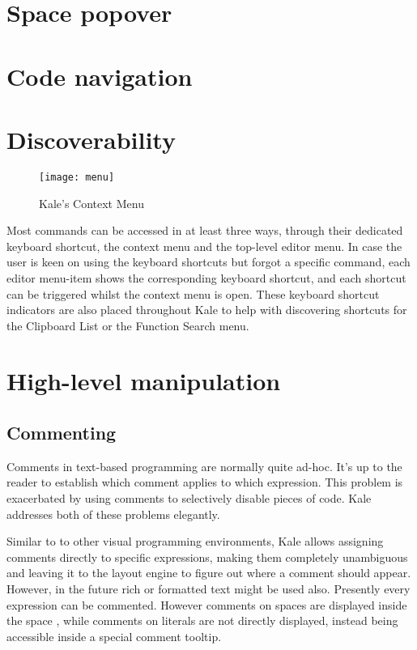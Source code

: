 \section{Space popover}




\section{Code navigation}


\needspace{8cm}
\section{Discoverability}
\begin{wrapfigure}[21]{r}{5.5cm}
\texttt{[image: menu]}
\caption{Kale's Context Menu}
\end{wrapfigure}
Most commands can be accessed in at least three ways, through their dedicated
keyboard shortcut, the context menu and the top-level editor menu. In case the
user is keen on using the keyboard shortcuts but forgot a specific command,
each editor menu-item shows the corresponding keyboard shortcut, and each
shortcut can be triggered whilst the context menu is open. These keyboard
shortcut indicators are also placed throughout Kale to help with discovering
shortcuts for the Clipboard List or the Function Search menu.




\section{High-level manipulation}

\subsection{Commenting}
Comments in text-based programming are normally quite ad-hoc. It's up to the
reader to establish which comment applies to which expression. This problem
is exacerbated by using comments to selectively disable pieces of code. Kale
addresses both of these problems elegantly.

Similar to to other visual
programming environments, Kale allows assigning comments directly to specific
expressions, making them completely unambiguous and leaving it to the layout
engine to figure out where a comment should appear. However, in the future rich or
formatted text might be used also. Presently every expression can be commented.
However comments on spaces are displayed inside the space , while
comments on literals are not directly displayed, instead being accessible
inside a special comment tooltip.

